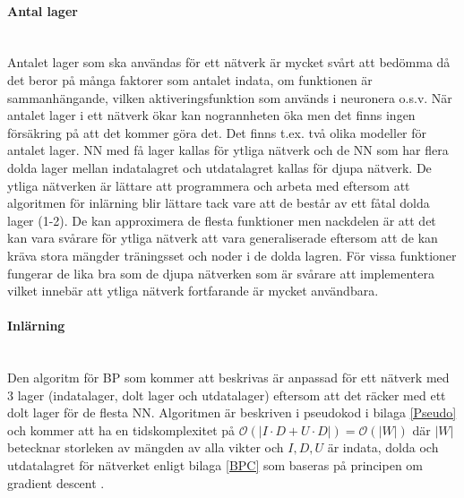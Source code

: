 \documentclass[a4paper,10pt]{article}
\begin{document}
\paragraph{Antal lager}\hspace{0pt}\\
Antalet lager som ska användas för ett nätverk är mycket svårt att bedömma då det beror på många faktorer som antalet indata, om funktionen är sammanhängande, vilken aktiveringsfunktion som används i neuronera o.s.v. När antalet lager i ett nätverk ökar kan nogrannheten öka men det finns ingen försäkring på att det kommer göra det. Det finns t.ex. två olika modeller för antalet lager. NN med få lager kallas för ytliga nätverk och de NN som har flera dolda lager mellan indatalagret och utdatalagret kallas för djupa nätverk\autocite{DL}. De ytliga nätverken är lättare att programmera och arbeta med eftersom att algoritmen för inlärning blir lättare tack vare att de består av ett fåtal dolda lager (1-2). De kan approximera de flesta funktioner\autocite{SLA} men nackdelen är att det kan vara svårare för ytliga nätverk att vara generaliserade eftersom att de kan kräva stora mängder träningsset och noder i de dolda lagren. För vissa funktioner fungerar de lika bra som de djupa nätverken som är svårare att implementera\autocite{SLA} vilket innebär att ytliga nätverk fortfarande är mycket användbara.  

\paragraph{Inlärning}\hspace{0pt}\\
Den algoritm för BP som kommer att beskrivas är anpassad för ett nätverk med 3 lager (indatalager, dolt lager och utdatalager) eftersom att det räcker med ett dolt lager för de flesta NN.\autocite{StackExchange}\autocite{SLA}  Algoritmen är beskriven i pseudokod i bilaga \ref{Pseudo} och kommer att ha en tidskomplexitet på $\mathcal{O}(|I\cdot D+U\cdot D|) = \mathcal{O}(|W|)$ där $|W|$ betecknar storleken av mängden av alla vikter och $I,D,U$ är indata, dolda och utdatalagret för nätverket enligt bilaga \ref{BPC} som baseras på principen om gradient descent \autocite{GD}.
\end{document}

